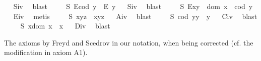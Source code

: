 \begin{isabellebody}
\isadelimproof
\ %
\endisadelimproof
%
\isatagproof
{}\isamarkupfalse%
\ S\isactrlsub i\isactrlsub v\ \isamarkupfalse%
\ blast%
\endisatagproof
{\isafoldproof}%
%
\isadelimproof
%
\endisadelimproof
\isanewline
\ \ \ \isamarkupfalse%
\ S{}{\isacharcolon}\ {\isachardoublequoteopen}E{\isacharparenleft}cod\ y{\isacharparenright}\ \isactrlbold {\isasymrightarrow}\ E\ y{\isachardoublequoteclose}%
\isadelimproof
\ %
\endisadelimproof
%
\isatagproof
{}\isamarkupfalse%
\ S\isactrlsub i\isactrlsub v\ \isamarkupfalse%
\ blast%
\endisatagproof
{\isafoldproof}%
%
\isadelimproof
%
\endisadelimproof
\isanewline
\ \ \ \isamarkupfalse%
\ S{}{\isacharcolon}\ {\isachardoublequoteopen}E{\isacharparenleft}x{\isasymcdot}y{\isacharparenright}\ \isactrlbold {\isasymleftrightarrow}\ dom\ x\ {\isasymsimeq}\ cod\ y{\isachardoublequoteclose}%
\isadelimproof
\ %
\endisadelimproof
%
\isatagproof
{}\isamarkupfalse%
\ E\isactrlsub i\isactrlsub v\ \isamarkupfalse%
\ metis%
\endisatagproof
{\isafoldproof}%
%
\isadelimproof
%
\endisadelimproof
\isanewline
\ \ \ \isamarkupfalse%
\ S{}{\isacharcolon}\ {\isachardoublequoteopen}x{\isasymcdot}{\isacharparenleft}y{\isasymcdot}z{\isacharparenright}\ {\isasymcong}\ {\isacharparenleft}x{\isasymcdot}y{\isacharparenright}{\isasymcdot}z{\isachardoublequoteclose}%
\isadelimproof
\ %
\endisadelimproof
%
\isatagproof
{}\isamarkupfalse%
\ A\isactrlsub i\isactrlsub v\ \isamarkupfalse%
\ blast%
\endisatagproof
{\isafoldproof}%
%
\isadelimproof
%
\endisadelimproof
\isanewline
\ \ \ \isamarkupfalse%
\ S{}{\isacharcolon}\ {\isachardoublequoteopen}{\isacharparenleft}cod\ y{\isacharparenright}{\isasymcdot}y\ {\isasymcong}\ y{\isachardoublequoteclose}%
\isadelimproof
\ %
\endisadelimproof
%
\isatagproof
{}\isamarkupfalse%
\ C\isactrlsub i\isactrlsub v\ \isamarkupfalse%
\ blast%
\endisatagproof
{\isafoldproof}%
%
\isadelimproof
%
\endisadelimproof
\isanewline
\ \ \ \isamarkupfalse%
\ S{}{\isacharcolon}\ {\isachardoublequoteopen}x{\isasymcdot}{\isacharparenleft}dom\ x{\isacharparenright}\ {\isasymcong}\ x{\isachardoublequoteclose}%
\isadelimproof
\ %
\endisadelimproof
%
\isatagproof
{}\isamarkupfalse%
\ D\isactrlsub i\isactrlsub v\ \isamarkupfalse%
\ blast%
\endisatagproof
{\isafoldproof}%
%
\isadelimproof
%
\endisadelimproof
\isanewline
\ \ \isamarkupfalse%
%
\isamarkuptrue%
%
\isamarkuptrue%
%
\begin{isamarkuptext}%
The axioms by Freyd and Scedrov  \cite{FreydScedrov90} in our notation, when being 
     corrected (cf. the modification in axiom A1).
    

\end{isamarkuptext}
\end{isabellebody}
